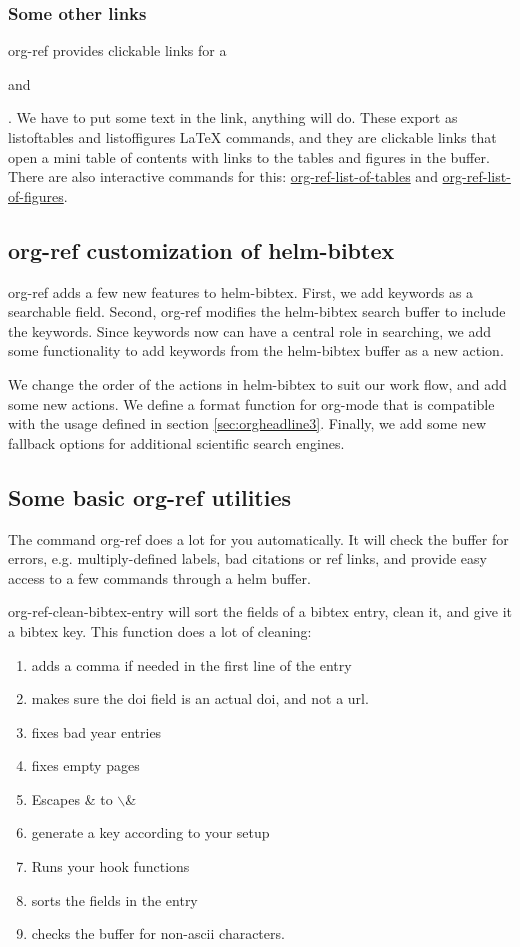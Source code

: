 \documentclass[11pt]{article}
\begin{document}
\subsubsection{Some other links}
\label{sec:orgheadline7}
 

org-ref provides clickable links for a \listoftables and \listoffigures. We have to put some text in the link, anything will do. These export as listoftables and listoffigures \LaTeX{} commands, and they are clickable links that open a mini table of contents with links to the tables and figures in the buffer. There are also interactive commands for this: \url{org-ref-list-of-tables} and \url{org-ref-list-of-figures}.

\subsection{org-ref customization of helm-bibtex}
\label{sec:orgheadline9}

org-ref adds a few new features to helm-bibtex. First, we add keywords as a searchable field. Second, org-ref modifies the helm-bibtex search buffer to include the keywords. Since keywords now can have a central role in searching, we add some functionality to add keywords from the helm-bibtex buffer as a new action.

We change the order of the actions in helm-bibtex to suit our work flow, and add some new actions. We define a format function for org-mode that is compatible with the usage defined in section \ref{sec:orgheadline3}. Finally, we add some new fallback options for additional scientific search engines.

\subsection{Some basic org-ref utilities}
\label{sec:orgheadline10}

The command org-ref does a lot for you automatically. It will check the buffer for errors, e.g. multiply-defined labels, bad citations or ref links, and provide easy access to a few commands through a helm buffer.

org-ref-clean-bibtex-entry will sort the fields of a bibtex entry, clean it, and give it a bibtex key. This function does a lot of cleaning:

\begin{enumerate}
\item adds a comma if needed in the first line of the entry
\item makes sure the doi field is an actual doi, and not a url.
\item fixes bad year entries
\item fixes empty pages
\item Escapes \& to $\backslash$&
\item generate a key according to your setup
\item Runs your hook functions
\item sorts the fields in the entry
\item checks the buffer for non-ascii characters.
\end{enumerate}
\end{document}
